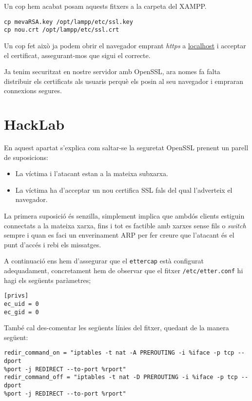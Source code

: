 \documentclass[a4paper,11pt]{scrartcl}
\begin{document}
Un cop hem acabat posam aquests fitxers a la carpeta del XAMPP.

\begin{verbatim}
cp mevaRSA.key /opt/lampp/etc/ssl.key
cp nou.crt /opt/lampp/etc/ssl.crt
\end{verbatim}

Un cop fet això ja podem obrir el navegador emprant \emph{https} a \href{https://localhost}{localhost}
i acceptar el certificat, assegurant-mos que sigui el correcte.

Ja tenim securitzat en nostre servidor amb OpenSSL, ara nomes fa falta distribuir
els certificats als usuaris perquè els posin al seu navegador i empraran connexions segures.

\section{HackLab}
En aquest apartat s'explica com saltar-se la seguretat OpenSSL prenent un parell de suposicions:

\begin{itemize}
  \item La víctima i l'atacant estan a la mateixa subxarxa.
  \item La víctima ha d'acceptar un nou certifica SSL fals del qual l'adverteix el navegador.
\end{itemize}

La primera suposició és senzilla, simplement implica que ambdós clients estiguin connectats
a la mateixa xarxa, fins i tot es factible amb xarxes sense fils o \emph{switch} sempre
i quan es faci un enverinament ARP per fer creure que l'atacant és el punt d'accés
i rebi els missatges.

A continuació ens hem d'assegurar que el \texttt{ettercap} està configurat adequadament,
concretament hem de observar que el fitxer \texttt{/etc/etter.conf} hi hagi els següents paràmetres;

\begin{verbatim}
[privs]
ec_uid = 0
ec_gid = 0
\end{verbatim}

També cal des-comentar les següents línies del fitxer, quedant de la manera següent:

\begin{verbatim}
redir_command_on = "iptables -t nat -A PREROUTING -i %iface -p tcp --dport
%port -j REDIRECT --to-port %rport"
redir_command_off = "iptables -t nat -D PREROUTING -i %iface -p tcp --dport
%port -j REDIRECT --to-port %rport"
\end{verbatim}
\end{document}
